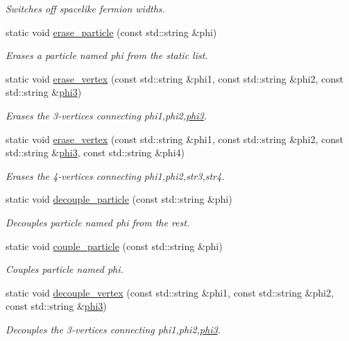 \begin{DoxyCompactItemize}
\begin{DoxyCompactList}\small\item\em Switches off spacelike fermion widths. \end{DoxyCompactList}\item 
static void \hyperlink{a00372_aa517bf6e9bb16ca21999b4f96039e0d5}{erase\+\_\+particle} (const std\+::string \&phi)
\begin{DoxyCompactList}\small\item\em Erases a particle named phi from the static list. \end{DoxyCompactList}\item 
static void \hyperlink{a00372_a8b0187733197a7fcbe21004033664b72}{erase\+\_\+vertex} (const std\+::string \&phi1, const std\+::string \&phi2, const std\+::string \&\hyperlink{a00424}{phi3})
\begin{DoxyCompactList}\small\item\em Erases the 3-\/vertices connecting phi1,phi2,\hyperlink{a00424}{phi3}. \end{DoxyCompactList}\item 
static void \hyperlink{a00372_a761070785a66c0c840f1b08bece67b0f}{erase\+\_\+vertex} (const std\+::string \&phi1, const std\+::string \&phi2, const std\+::string \&\hyperlink{a00424}{phi3}, const std\+::string \&phi4)
\begin{DoxyCompactList}\small\item\em Erases the 4-\/vertices connecting phi1,phi2,str3,str4. \end{DoxyCompactList}\item 
static void \hyperlink{a00372_a46c5d085b3af9acdfe0784662f572e28}{decouple\+\_\+particle} (const std\+::string \&phi)
\begin{DoxyCompactList}\small\item\em Decouples particle named phi from the rest. \end{DoxyCompactList}\item 
static void \hyperlink{a00372_af843c90460f953d8717728aa89d70552}{couple\+\_\+particle} (const std\+::string \&phi)
\begin{DoxyCompactList}\small\item\em Couples particle named phi. \end{DoxyCompactList}\item 
static void \hyperlink{a00372_ad9ef56b861b25d8f9440bd97f635cc40}{decouple\+\_\+vertex} (const std\+::string \&phi1, const std\+::string \&phi2, const std\+::string \&\hyperlink{a00424}{phi3})
\begin{DoxyCompactList}\small\item\em Decouples the 3-\/vertices connecting phi1,phi2,\hyperlink{a00424}{phi3}. \end{DoxyCompactList}\item 

\end{DoxyCompactItemize}
